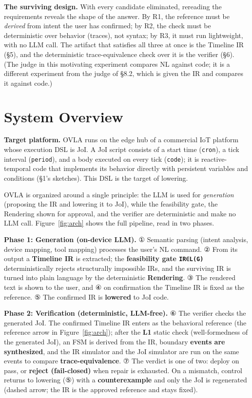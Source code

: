 \documentclass[sigconf,nonacm,anonymous,review]{acmart}
\begin{document}
\textbf{The surviving design.} With every candidate eliminated, rereading the requirements reveals the shape of the answer. By R1, the reference must be \emph{derived} from intent the user has confirmed; by R2, the check must be deterministic over behavior (traces), not syntax; by R3, it must run lightweight, with no LLM call. The artifact that satisfies all three at once is the Timeline IR (\S5), and the deterministic trace-equivalence check over it is the verifier (\S6). (The judge in this motivating experiment compares NL against code; it is a different experiment from the judge of \S8.2, which is given the IR and compares it against code.)

\section{System Overview}

\textbf{Target platform.} OVLA runs on the edge hub of a commercial IoT platform whose execution DSL is JoI. A JoI script consists of a start time (\texttt{cron}), a tick interval (\texttt{period}), and a body executed on every tick (\texttt{code}); it is reactive-temporal code that implements its behavior directly with persistent variables and conditions (\S1's sketches). This DSL is the target of lowering.

OVLA is organized around a single principle: the LLM is used for \emph{generation} (proposing the IR and lowering it to JoI), while the feasibility gate, the Rendering shown for approval, and the verifier are deterministic and make no LLM call. Figure~\ref{fig:arch} shows the full pipeline, read in two phases.

\textbf{Phase 1: Generation (on-device LLM).} ① Semantic parsing (intent analysis, device mapping, tool mapping) processes the user's NL command. ② From its output a \textbf{Timeline IR} is extracted; the \textbf{feasibility gate \texttt{IR∈L(G)}} deterministically rejects structurally impossible IRs, and the surviving IR is turned into plain language by the deterministic \textbf{Rendering}. ③ The rendered text is shown to the user, and ④ on confirmation the Timeline IR is fixed as the reference. ⑤ The confirmed IR is \textbf{lowered} to JoI code.

\textbf{Phase 2: Verification (deterministic, LLM-free).} ⑥ The verifier checks the generated JoI. The confirmed Timeline IR enters as the behavioral reference (the reference arrow in Figure~\ref{fig:arch}); after the \textbf{L1} static check (well-formedness of the generated JoI), an FSM is derived from the IR, boundary \textbf{events are synthesized}, and the IR simulator and the JoI simulator are run on the same events to compare \textbf{trace-equivalence}. ⑦ The verdict is one of two: deploy on pass, or \textbf{reject (fail-closed)} when repair is exhausted. On a mismatch, control returns to lowering (⑤) with a \textbf{counterexample} and only the JoI is regenerated (dashed arrow; the IR is the approved reference and stays fixed).
\end{document}
